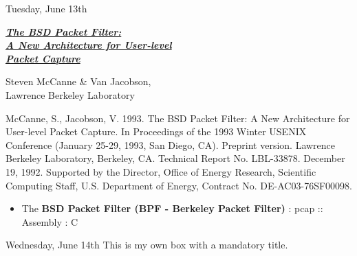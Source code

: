\documentclass[11pt]{article}
\begin{document}
\begin{shininggoldbox}{Tuesday, June 13th}
\begin{multicols}{2}
    \large\textbf{\textit{\underline{The BSD Packet Filter:}}} \\ 
    \large\textbf{\textit{\underline{A New Architecture for User-level}}} \\
    \large\textbf{\textit{\underline{Packet Capture}}}
    \bigskip
    
    \normalsize Steven McCanne \& Van Jacobson, \\
    Lawrence Berkeley Laboratory
    \columnbreak
    \begin{mdframed}
    \tiny McCanne, S., Jacobson, V. 1993. The BSD Packet Filter: A New Architecture for User-level Packet Capture. In Proceedings of the 1993 Winter USENIX Conference (January 25-29, 1993, San Diego, CA). Preprint version. Lawrence Berkeley Laboratory, Berkeley, CA. Technical Report No. LBL-33878. December 19, 1992. Supported by the Director, Office of Energy Research, Scientific Computing Staff, U.S. Department of Energy, Contract No. DE-AC03-76SF00098.
    \end{mdframed}
    \vspace{-2em}
\end{multicols}
\vspace{-2em}
\textbf{\hline}
\begin{itemize}
    \normalsize\item The \textbf{BSD Packet Filter (BPF - Berkeley Packet Filter)} : pcap :: Assembly : C
\end{itemize}
\end{shininggoldbox}

\begin{center}
\vspace{-0.25em}
\hspace{0.2cm}
\vspace{-0.4em}
\end{center}

\begin{shininggoldbox}{Wednesday, June 14th}
This is my own box with a mandatory title.
\end{shininggoldbox}

\begin{center}
\vspace{-0.25em}
\hspace{0.2cm}
\vspace{-0.4em}
\end{center}
\end{document}
